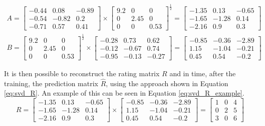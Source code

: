 \begin{equation}\label{eq:svd_AB_num_squeezing}
\begin{split}
A = \begin{bmatrix}
-0.44 & 0.08 	& -0.89 \\ 
-0.54 & -0.82 	& 0.2	\\ 
-0.71 & 0.57 	& 0.41
\end{bmatrix} \times 
\begin{bmatrix}
9.2 & 0		& 0		\\ 
0 	& 2.45	& 0		\\ 
0 	& 0		& 0.53
\end{bmatrix}^{\frac{1}{2}} =
\begin{bmatrix}
   -1.35 &   0.13 &  -0.65 \\
   -1.65 &  -1.28 &   0.14 \\
   -2.16 &   0.9  &   0.3
\end{bmatrix}
\\
B = \begin{bmatrix}
9.2 & 0		& 0		\\ 
0 	& 2.45	& 0		\\ 
0 	& 0		& 0.53
\end{bmatrix}^{\frac{1}{2}} \times
\begin{bmatrix}
   -0.28 &   0.73  &  0.62 \\
   -0.12 &  -0.67  &  0.74 \\
   -0.95 &  -0.13  & -0.27
\end{bmatrix} =
\begin{bmatrix}
   -0.85 &  -0.36 &  -2.89 \\
    1.15 &  -1.04 &  -0.21 \\
    0.45 &   0.54 &  -0.2
\end{bmatrix}
\end{split}
\end{equation}
\normalsize

It is then possible to reconstruct the rating matrix $R$ and in time, after the training, the prediction matrix $\hat{R}$, using the approach shown in Equation \ref{eq:svd_R}. An example of this can be seen in Equation \ref{eq:svd_R_example}.
\footnotesize
\begin{equation}\label{eq:svd_R_example}
R = \begin{bmatrix}
   -1.35 &   0.13 &  -0.65 \\
   -1.65 &  -1.28 &   0.14 \\
   -2.16 &   0.9  &   0.3
\end{bmatrix} \times
\begin{bmatrix}
   -0.85 &  -0.36 &  -2.89 \\
    1.15 &  -1.04 &  -0.21 \\
    0.45 &   0.54 &  -0.2
\end{bmatrix} = 
\begin{bmatrix}
1 & 0 & 4\\ 
0 & 2 & 5\\ 
3 & 0 & 6
\end{bmatrix}
\end{equation}
\normalsize
